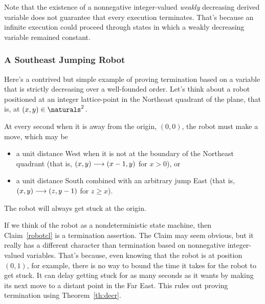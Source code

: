 \begin{editingnotes}
Note that the existence of a nonnegative integer-valued \emph{weakly}
decreasing derived variable does not guarantee that every execution
terminates.  That's because an infinite execution could proceed through
states in which a weakly decreasing variable remained constant.

\subsubsection{A Southeast Jumping Robot}

\iffalse Begin by defining the trivial ``pick how long'' game: P1 picks $n
\in \naturals$, the P2 and P1 alternate making forced moves.  The game
ends after $n$ forced moves; the last person to move wins.  So P1 strategy
is ``pick and even number.''  Insert here the discussion of ``terminates,
but no bound on number of steps...'' used below.

May also tell the ``guess a bigger number game''joke.
\fi

Here's a contrived but simple example of proving termination based on a
variable that is strictly decreasing over a well-founded order.  Let's
think about a robot positioned at an integer lattice-point in the
Northeast quadrant of the plane, that is, at $(x,y) \in \naturals^2$.

At every second when it is away from the origin, $(0,0)$, the robot must
make a move, which may be
\begin{itemize}

\item a unit distance West when it is not at the boundary of the Northeast
  quadrant (that is, $(x,y) \mathrel{\longrightarrow} (x-1,y)$ for $x>0$), or

\item a unit distance South combined with an arbitrary jump East (that is,
     $(x,y) \mathrel{\longrightarrow} (z,y-1)$ for $z\geq x$).

\end{itemize}
\begin{claim}\label{robotcl}
The robot will always get stuck at the origin.
\end{claim}

If we think of the robot as a nondeterministic state machine, then
Claim~\ref{robotcl} is a termination assertion.  The Claim may seem
obvious, but it really has a different character than termination based on
nonnegative integer-valued variables.  That's because, even knowing that
the robot is at position $(0,1)$, for example, there is no way to bound
the time it takes for the robot to get stuck.  It can delay getting stuck
for as many seconds as it wants by making its next move to a distant point
in the Far East.  This rules out proving termination using
Theorem~\ref{th:decr}.


\end{editingnotes}
